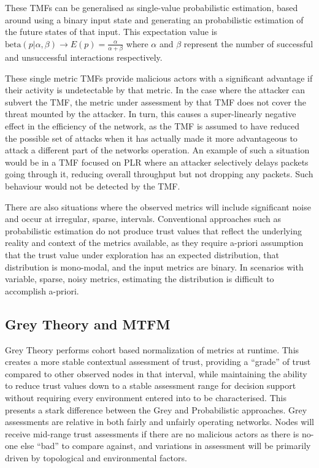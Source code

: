 \documentclass[runningheads,a4paper]{llncs}
\begin{document}
These TMFs can be generalised as single-value probabilistic estimation, based around using a binary input state and generating an probabilistic estimation of the future states of that input. This expectation value is $\text{beta}(p|\alpha,\beta) \to E(p) = \frac{\alpha}{\alpha+\beta}$ where $\alpha$ and $\beta$ represent the number of successful and unsuccessful interactions respectively.

These single metric TMFs provide malicious actors with a significant advantage if their activity is undetectable by that metric.
In the case where the attacker can subvert the TMF, the metric under assessment by that TMF does not cover the threat mounted by the attacker.
In turn, this causes a super-linearly negative effect in the efficiency of the network, as the TMF is assumed to have reduced the possible set of attacks when it has actually made it more advantageous to attack a different part of the networks operation.
An example of such a situation would be in a TMF focused on PLR where an attacker selectively delays packets going through it, reducing overall throughput but not dropping any packets.
Such behaviour would not be detected by the TMF.

There are also situations where the observed metrics will include significant noise and occur at irregular, sparse, intervals.
Conventional approaches such as probabilistic estimation do not produce trust values that reflect the underlying reality and context of the metrics available, as they require a-priori assumption that the trust value under exploration has an expected distribution, that distribution is mono-modal, and the input metrics are binary.
In scenarios with variable, sparse, noisy metrics, estimating the distribution is difficult to accomplish a-priori.

\subsection{Grey Theory and MTFM}

Grey Theory performs cohort based normalization of metrics at runtime. 
This creates a more stable contextual assessment of trust, providing a ``grade'' of trust compared to other observed nodes in that interval, while maintaining the ability to reduce trust values down to a stable assessment range for decision support without requiring every environment entered into to be characterised.
This presents a stark difference between the Grey and Probabilistic approaches.
Grey assessments are relative in both fairly and unfairly operating networks.
Nodes will receive mid-range trust assessments if there are no malicious actors as there is no-one else ``bad'' to compare against, and variations in assessment will be primarily driven by topological and environmental factors.
\end{document}
